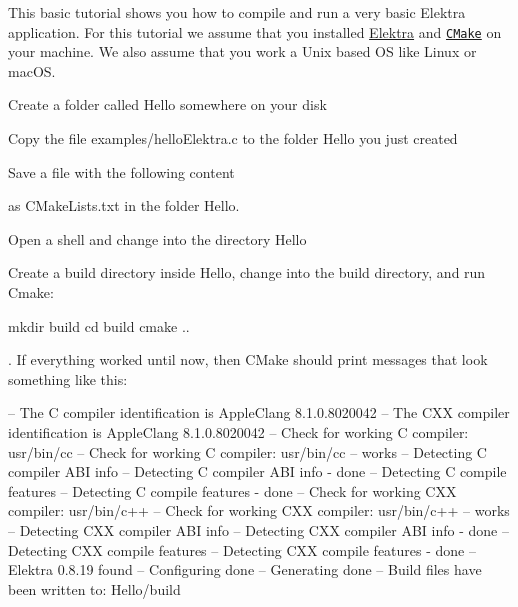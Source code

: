 This basic tutorial shows you how to compile and run a very basic Elektra application. For this tutorial we assume that you installed \hyperlink{doc_INSTALL_md}{Elektra} and \href{http://cmake.org}{\tt C\+Make} on your machine. We also assume that you work a Unix based OS like Linux or mac\+OS.


\begin{DoxyEnumerate}
\item Create a folder called {\ttfamily Hello} somewhere on your disk
\item Copy the file {\ttfamily examples/hello\+Elektra.\+c} to the folder {\ttfamily Hello} you just created
\item Save a file with the following content
\end{DoxyEnumerate}




as {\ttfamily C\+Make\+Lists.\+txt} in the folder {\ttfamily Hello}.


\begin{DoxyEnumerate}
\item Open a shell and change into the directory {\ttfamily Hello}
\item Create a build directory inside {\ttfamily Hello}, change into the build directory, and run Cmake\+:
\end{DoxyEnumerate}


\begin{DoxyCode}
mkdir build
cd build
cmake ..
\end{DoxyCode}


. If everything worked until now, then C\+Make should print messages that look something like this\+:


\begin{DoxyCode}
-- The C compiler identification is AppleClang 8.1.0.8020042
-- The CXX compiler identification is AppleClang 8.1.0.8020042
-- Check for working C compiler: usr/bin/cc
-- Check for working C compiler: usr/bin/cc -- works
-- Detecting C compiler ABI info
-- Detecting C compiler ABI info - done
-- Detecting C compile features
-- Detecting C compile features - done
-- Check for working CXX compiler: usr/bin/c++
-- Check for working CXX compiler: usr/bin/c++ -- works
-- Detecting CXX compiler ABI info
-- Detecting CXX compiler ABI info - done
-- Detecting CXX compile features
-- Detecting CXX compile features - done
-- Elektra 0.8.19 found
-- Configuring done
-- Generating done
-- Build files have been written to: Hello/build
\end{DoxyCode}



